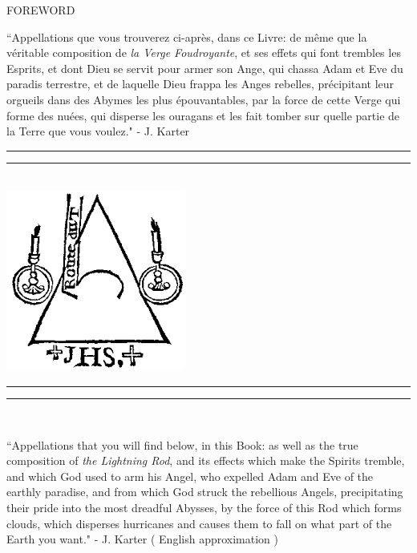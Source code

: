 \documentclass[11pt]{article}
\begin{document}
\begin{center}
\huge FOREWORD
\end{center}

\begingroup
\begin{center}
``Appellations que vous trouverez ci-après, dans ce Livre: de même que la véritable composition de \textit{la Verge Foudroyante}, et ses effets qui font trembles les Esprits, et dont Dieu se servit pour armer son Ange, qui chassa Adam et Eve du paradis terrestre, et de laquelle Dieu frappa les Anges rebelles, précipitant leur orgueils dans des Abymes les plus épouvantables, par la force de cette Verge qui forme des nuées, qui disperse les ouragans et les fait tomber sur quelle partie de la Terre que vous voulez."
\rightskip\leftskip
\phantom{text} \hfill - J. Karter
\end{center}
\endgroup


\begingroup
\begin{center}
\rule{\textwidth}{1.6pt}\vspace*{-\baselineskip}\vspace*{1pt}
\rule{\textwidth}{0.4pt}\\[\baselineskip]
\includegraphics[scale=1.5]{verge.png}
\rule{\textwidth}{0.4pt}\vspace*{-\baselineskip}\vspace{2pt}
\rule{\textwidth}{1.6pt}\\[\baselineskip]
\end{center}
\endgroup

\begingroup
\begin{center}
``Appellations that you will find below, in this Book: as well as the true composition of \textit{the Lightning Rod}, and its effects which make the Spirits tremble, and which God used to arm his Angel, who expelled Adam and Eve of the earthly paradise, and from which God struck the rebellious Angels, precipitating their pride into the most dreadful Abysses, by the force of this Rod which forms clouds, which disperses hurricanes and causes them to fall on what part of the Earth you want."
\rightskip\leftskip
\phantom{text} \hfill - J. Karter ( English approximation )
\end{center}
\endgroup
\end{document}
